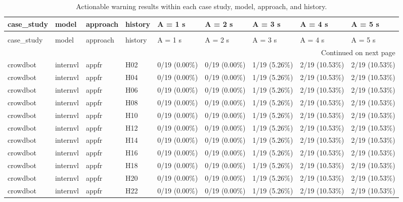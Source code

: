 \begin{longtable}{lllllllll}
\caption{Actionable warning results within each case study, model, approach, and history.} \label{tab:rq4-actionable-by-case-study-paper-table} \\
\toprule
case\_study & model & approach & history & A = 1 s & A = 2 s & A = 3 s & A = 4 s & A = 5 s \\
\midrule
\endfirsthead
\caption[]{Actionable warning results within each case study, model, approach, and history.} \\
\toprule
case\_study & model & approach & history & A = 1 s & A = 2 s & A = 3 s & A = 4 s & A = 5 s \\
\midrule
\endhead
\midrule
\multicolumn{9}{r}{Continued on next page} \\
\midrule
\endfoot
\bottomrule
\endlastfoot
crowdbot & internvl & appfr & H02 & 0/19 (0.00\%) & 0/19 (0.00\%) & 1/19 (5.26\%) & 2/19 (10.53\%) & 2/19 (10.53\%) \\
crowdbot & internvl & appfr & H04 & 0/19 (0.00\%) & 0/19 (0.00\%) & 1/19 (5.26\%) & 2/19 (10.53\%) & 2/19 (10.53\%) \\
crowdbot & internvl & appfr & H06 & 0/19 (0.00\%) & 0/19 (0.00\%) & 1/19 (5.26\%) & 2/19 (10.53\%) & 2/19 (10.53\%) \\
crowdbot & internvl & appfr & H08 & 0/19 (0.00\%) & 0/19 (0.00\%) & 1/19 (5.26\%) & 2/19 (10.53\%) & 2/19 (10.53\%) \\
crowdbot & internvl & appfr & H10 & 0/19 (0.00\%) & 0/19 (0.00\%) & 1/19 (5.26\%) & 2/19 (10.53\%) & 2/19 (10.53\%) \\
crowdbot & internvl & appfr & H12 & 0/19 (0.00\%) & 0/19 (0.00\%) & 1/19 (5.26\%) & 2/19 (10.53\%) & 2/19 (10.53\%) \\
crowdbot & internvl & appfr & H14 & 0/19 (0.00\%) & 0/19 (0.00\%) & 1/19 (5.26\%) & 2/19 (10.53\%) & 2/19 (10.53\%) \\
crowdbot & internvl & appfr & H16 & 0/19 (0.00\%) & 0/19 (0.00\%) & 1/19 (5.26\%) & 2/19 (10.53\%) & 2/19 (10.53\%) \\
crowdbot & internvl & appfr & H18 & 0/19 (0.00\%) & 0/19 (0.00\%) & 1/19 (5.26\%) & 2/19 (10.53\%) & 2/19 (10.53\%) \\
crowdbot & internvl & appfr & H20 & 0/19 (0.00\%) & 0/19 (0.00\%) & 1/19 (5.26\%) & 2/19 (10.53\%) & 2/19 (10.53\%) \\
crowdbot & internvl & appfr & H22 & 0/19 (0.00\%) & 0/19 (0.00\%) & 1/19 (5.26\%) & 2/19 (10.53\%) & 2/19 (10.53\%) \\

\end{longtable}
